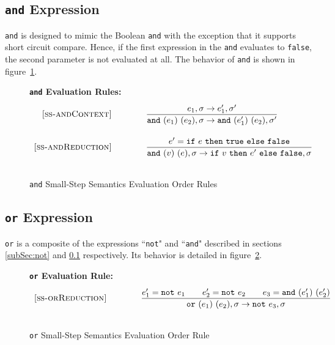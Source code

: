 \documentclass{article}
\newcommand{\ife}[3]{\mbox{\tt if}~{#1}~\mbox{\tt then}~{#2}~\mbox{\tt else}~{#3}}
\newcommand{\note}[1]{\mbox{\tt not}~#1}
\newcommand{\ande}[2]{\mbox{\tt and}~(#1)~(#2)}
\newcommand{\ore}[2]{\mbox{\tt or}~(#1)~(#2)}
\newcommand{\true}{\mbox{\tt true}}
\newcommand{\false}{\mbox{\tt false}}
\begin{document}
\subsection{{\tt and} Expression}\label{subSec:and}

{\tt and} is designed to mimic the Boolean {\tt and} with the exception that it supports short circuit compare.  Hence, if the first expression in the {\tt and} evaluates to {\false}, the second parameter is not evaluated at all.  The behavior of {\tt and} is shown in figure~\ref{fig:andRules}.

\begin{figure}[H]
\caption{{\tt and} Small-Step Semantics Evaluation Order Rules}
\label{fig:andRules}
{\bf {\tt and} Evaluation Rules:}
\[
\\
\begin{array}{r@{\qquad\qquad}l}
\ssrule{ss-andContext}{
  \sstep{e_1}{\sigma}{e_1'}{\sigma'}
}{
  \sstep{\ande{e_1}{e_2}}{\sigma}{\ande{e_1'}{e_2}}{\sigma'}
}
\ssrule{ss-andReduction}{
e'=\ife{e}{\true}{\false}
}{
  \sstep{\ande{v}{e}}{\sigma}{\ife{v}{e'}{\false}}{\sigma}
}
\end{array}
\]
\end{figure}

\subsection{{\tt or} Expression}

{\tt or} is a composite of the expressions ``{\tt not}" and ``{\tt and}" described in sections \ref{subSec:not} and \ref{subSec:and} respectively.  Its behavior is detailed in figure~\ref{fig:orRules}.

\begin{figure}[H]
\caption{{\tt or} Small-Step Semantics Evaluation Order Rule}
\label{fig:orRules}
{\bf {\tt or} Evaluation Rule:} 
\[
\\
\begin{array}{r@{\qquad\qquad}l}
\ssrule{ss-orReduction}{
  e_1'=\note{e_1} \qquad e_2'=\note{e_2} \qquad e_3=\ande{e_1'}{e_2'}
}{
  \sstep{\ore{e_1}{e_2}}{\sigma}{\note{e_3}}{\sigma}
}
\end{array}
\]
\end{figure}
\end{document}
